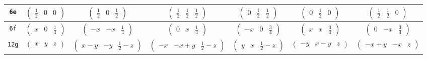 \documentclass[fleqn,9pt,landscape]{jsarticle}
\begin{document}
\begin{center}
\begin{longtable}{ccccccc}
{\tt 6e} & $ \begin{pmatrix} \frac{1}{2} & 0 & 0 \end{pmatrix} $ & $ \begin{pmatrix} \frac{1}{2} & 0 & \frac{1}{2} \end{pmatrix} $ & $ \begin{pmatrix} \frac{1}{2} & \frac{1}{2} & \frac{1}{2} \end{pmatrix} $ & $ \begin{pmatrix} 0 & \frac{1}{2} & \frac{1}{2} \end{pmatrix} $ & $ \begin{pmatrix} 0 & \frac{1}{2} & 0 \end{pmatrix} $ & $ \begin{pmatrix} \frac{1}{2} & \frac{1}{2} & 0 \end{pmatrix} $ \\ \hline
{\tt 6f} & $ \begin{pmatrix} x & 0 & \frac{1}{4} \end{pmatrix} $ & $ \begin{pmatrix} - x & - x & \frac{1}{4} \end{pmatrix} $ & $ \begin{pmatrix} 0 & x & \frac{1}{4} \end{pmatrix} $ & $ \begin{pmatrix} - x & 0 & \frac{3}{4} \end{pmatrix} $ & $ \begin{pmatrix} x & x & \frac{3}{4} \end{pmatrix} $ & $ \begin{pmatrix} 0 & - x & \frac{3}{4} \end{pmatrix} $ \\ \hline
{\tt 12g} & $ \begin{pmatrix} x & y & z \end{pmatrix} $ & $ \begin{pmatrix} x - y & - y & \frac{1}{2} - z \end{pmatrix} $ & $ \begin{pmatrix} - x & - x + y & \frac{1}{2} - z \end{pmatrix} $ & $ \begin{pmatrix} y & x & \frac{1}{2} - z \end{pmatrix} $ & $ \begin{pmatrix} - y & x - y & z \end{pmatrix} $ & $ \begin{pmatrix} - x + y & - x & z \end{pmatrix} $ \\

\end{longtable}
\end{center}
\end{document}
